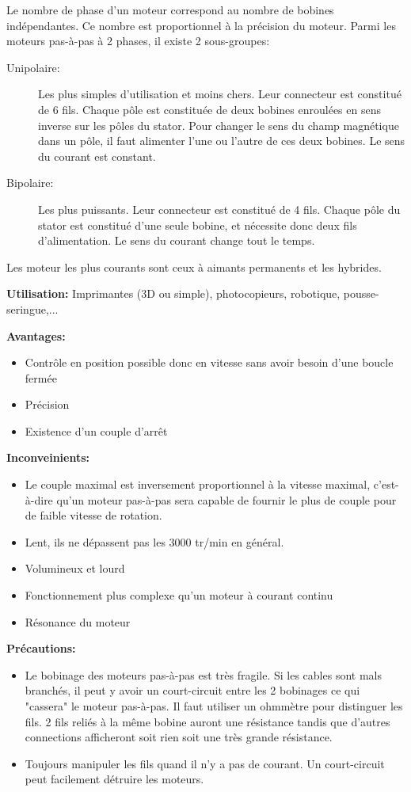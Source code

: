 \documentclass[a4paper, 11pt]{report}
\begin{document}
Le nombre de phase d'un moteur correspond au nombre de bobines indépendantes. Ce nombre est proportionnel à la précision du moteur.
Parmi les moteurs pas-à-pas à 2 phases, il existe 2 sous-groupes:
\begin{description}
\item[Unipolaire:]Les plus simples d'utilisation et moins chers. Leur connecteur est constitué de 6 fils. Chaque pôle est constituée de deux bobines enroulées en sens inverse sur les pôles du stator. Pour changer le sens du champ magnétique dans un pôle, il faut alimenter l'une ou l'autre de ces deux bobines. Le sens du courant est constant.
\item[Bipolaire:]Les plus puissants. Leur connecteur est constitué de 4 fils. Chaque pôle du stator est constitué d'une seule bobine, et nécessite donc deux fils d'alimentation. Le sens du courant change tout le temps.
\end{description}

Les moteur les plus courants sont ceux à aimants permanents et les hybrides.

\textbf{Utilisation:} Imprimantes (3D ou simple), photocopieurs, robotique, pousse-seringue,...

\textbf{Avantages:}
\begin{itemize}
\item Contrôle en position possible donc en vitesse sans avoir besoin d'une boucle fermée
\item Précision
\item Existence d'un couple d'arrêt
\end{itemize}

\textbf{Inconveinients:}
\begin{itemize}
\item Le couple maximal est inversement proportionnel à la vitesse maximal, c'est-à-dire qu'un moteur pas-à-pas sera capable de fournir le plus de couple pour de faible vitesse de rotation.
\item Lent, ils ne dépassent pas les 3000 tr/min en général.
\item Volumineux et lourd
\item Fonctionnement plus complexe qu'un moteur à courant continu
\item Résonance du moteur
\end{itemize}

\textbf{Précautions:}
\begin{itemize}
\item Le bobinage des moteurs pas-à-pas est très fragile. Si les cables sont mals branchés, il peut y avoir un court-circuit entre les 2 bobinages ce qui "cassera" le moteur pas-à-pas. Il faut utiliser un ohmmètre pour distinguer les fils. 2 fils reliés à la même bobine auront une résistance tandis que d'autres connections afficheront soit rien soit une très grande résistance.
\item Toujours manipuler les fils quand il n'y a pas de courant. Un court-circuit peut facilement détruire les moteurs.
\end{itemize}
\end{document}
